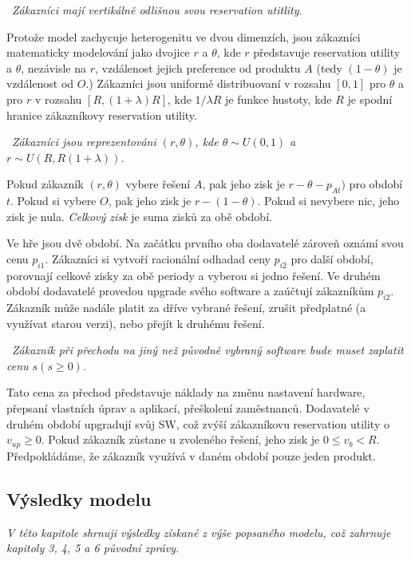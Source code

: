\begin{multicols}{2}
	\vspace{10pt}
	~{\em Zákazníci mají vertikálně odlišnou svou reservation utitlity.}
	\vspace{10pt}

	Protože model zachycuje heterogenitu ve dvou dimenzích, jsou zákazníci matematicky modelování jako dvojice $r$ a $\theta$, kde $r$ představuje reservation utility a $\theta$, nezávisle na $r$, vzdálenost jejich preference od produktu $A$ (tedy $(1-\theta)$ je vzdálenost od $O$.) Zákazníci jsou uniformě distribuovaní v rozsahu $[0,1]$ pro $\theta$ a pro $r$ v rozsahu $[R, (1+\lambda)R]$, kde $1/\lambda R$ je funkce hustoty, kde $R$ je spodní hranice zákazníkovy reservation utility.

		\vspace{10pt}
		~{\em Zákazníci jsou reprezentováni $(r,\theta)$, kde $\theta \sim U(0,1)$ a $r \sim U(R, R(1+\lambda))$.}
		\vspace{10pt}

	Pokud zákazník $(r,\theta)$ vybere řešení $A$, pak jeho zisk je $r-\theta - p_{At})$ pro období $t$. Pokud si vybere $O$, pak jeho zisk je $r-(1-\theta)$. Pokud si nevybere nic, jeho zisk je nula. {\em Celkový zisk} je suma zisků za obě období.

	Ve hře jsou dvě období. Na začátku prvního oba dodavatelé zároveň oznámí svou cenu $p_{i1}$. Zákazníci si vytvoří racionální odhadad ceny $p_{i2}$ pro další období, porovnají celkové zisky za obě periody a vyberou si jedno řešení. Ve druhém období dodavatelé provedou upgrade svého software a zaúčtují zákazníkům $p_{i2}$. Zákazník může nadále platit za dříve vybrané řešení, zrušit předplatné (a využívat starou verzi), nebo přejít k druhému řešení.

		\vspace{10pt}
		~{\em Zákazník při přechodu na jiný než původně vybraný software bude muset zaplatit cenu $s (s\geq0)$.}
		\vspace{10pt}

	Tato cena za přechod představuje náklady na změnu nastavení hardware, přepsaní vlastních úprav a aplikací, přeškolení zaměstnanců. Dodavatelé v druhém období upgradují svůj SW, což zvýší zákazníkovu reservation utility o $v_{up}\geq0$. Pokud zákazník zůstane u zvoleného řešení, jeho zisk je $0\leq v_b < R$. Předpokládáme, že zákazník využívá v daném období pouze jeden produkt.

	\subsection*{Výsledky modelu}
	{\em V této kapitole shrnuji výsledky získané z výše popsaného modelu, což zahrnuje kapitoly 3, 4, 5 a 6 původní zprávy.}


\end{multicols}
